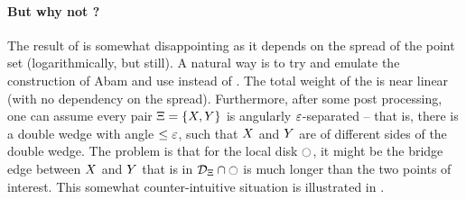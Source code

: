 \documentclass[12pt]{article}%
\begin{document}
\paragraph{But why not \SSPD?}

The result of  is somewhat disappointing as it depends
on the spread of the point set (logarithmically, but still). A natural
way is to try and emulate the construction of Abam \etal
\cite{abfg-rftgs-09} and use \SSPD instead of \WSPD. The total weight
of the \SSPD is near linear (with no dependency on the
spread). Furthermore, after some post processing, one can assume every
pair $\Xi = \{ X, Y \}$ is angularly $\varepsilon$-separated -- that is,
there is a double wedge with angle $\leq \varepsilon$, such that $X$ and
$Y$ are of different sides of the double wedge. The problem is that
for the local disk $\ocircle$, it might be
the bridge edge between $X$ and $Y$ that is in $\mathcal{D}_\Xi \cap
\ocircle$ is much longer than the two points of interest. This somewhat
counter-intuitive situation is illustrated in .
\end{document}
